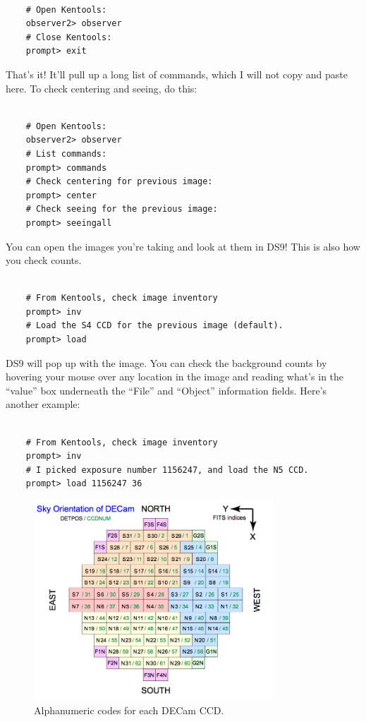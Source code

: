 \begin{verbatim}

    # Open Kentools:
    observer2> observer
    # Close Kentools:
    prompt> exit
\end{verbatim}

That's it! It'll pull up a long list of commands, which I will not copy and paste here. To check centering and seeing, do this: 

\begin{verbatim}

    # Open Kentools:
    observer2> observer
    # List commands:
    prompt> commands
    # Check centering for previous image:
    prompt> center
    # Check seeing for the previous image:
    prompt> seeingall
\end{verbatim}

You can open the images you're taking and look at them in DS9! This is also how you check counts. 

\begin{verbatim}

    # From Kentools, check image inventory
    prompt> inv
    # Load the S4 CCD for the previous image (default). 
    prompt> load
\end{verbatim}

DS9 will pop up with the image. You can check the background counts by hovering your mouse over any location in the image and reading what's in the ``value'' box underneath the ``File'' and ``Object'' information fields.  Here's another example:
\begin{verbatim}

    # From Kentools, check image inventory
    prompt> inv
    # I picked exposure number 1156247, and load the N5 CCD. 
    prompt> load 1156247 36
\end{verbatim}

\begin{figure}[h!]
    \centering\includegraphics[width=0.8\textwidth]{figs/observing/DECamOrientation.png}
    \caption{Alphanumeric codes for each DECam CCD.}
    \label{fig:decamccds}
\end{figure}

